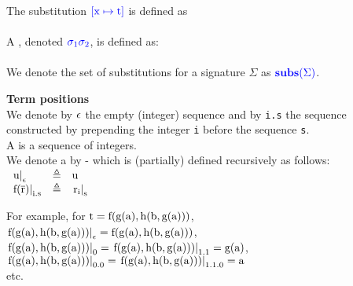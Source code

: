 \smallskip

\noindent
The substitution $\textcolor{blue}{\mathrm{[x \mapsto t]}}$ is defined as \\
\\
A , denoted {$\textcolor{blue}{\mathrm{\sigma_1\sigma_2}}$}, is defined as:\\
\\
We denote the set of substitutions for a signature $\Sigma{}$ as $\textcolor{blue}{\mathrm{\mathbf{subs}(\Sigma)}}$.

\bigskip

\noindent
\textbf{Term positions}\\
We denote by $\epsilon$ the empty (integer) sequence and by \lstinline{i.s} the sequence constructed by prepending the integer \lstinline{i} before the sequence \lstinline{s}.\\
A  is a sequence of integers.\\
We denote a  by  - which is (partially) defined recursively as follows:\\
$
\begin{array}{lll}
	\left.\mathrm{u}\right|_{\mathrm{\epsilon}}    & \triangleq & \mathrm{u} \\
	\left.\mathrm{f(\mathrm{\overline{r}})}\right|_{\mathrm{i.s}} & \triangleq & \left.\mathrm{\mathrm{r}_{\mathrm{i}}}\right|_{\mathrm{s}}
\end{array}
$

\noindent
For example, for  $\mathrm{t=f(g(a),h(b,g(a)))}$, \\
$\left.\mathrm{f(g(a),h(b,g(a)))}\right|_{\mathrm{\epsilon}}=\mathrm{f(g(a),h(b,g(a)))}$, \\
$\left.\mathrm{f(g(a),h(b,g(a)))}\right|_{\mathrm{0}}        =\left.\mathrm{f(g(a),h(b,g(a)))}\right|_{\mathrm{1.1}}=\mathrm{g(a)}$, \\
$\left.\mathrm{f(g(a),h(b,g(a)))}\right|_{\mathrm{0.0}}      =\left.\mathrm{f(g(a),h(b,g(a)))}\right|_{\mathrm{1.1.0}}=\mathrm{a}$ \\
etc.


